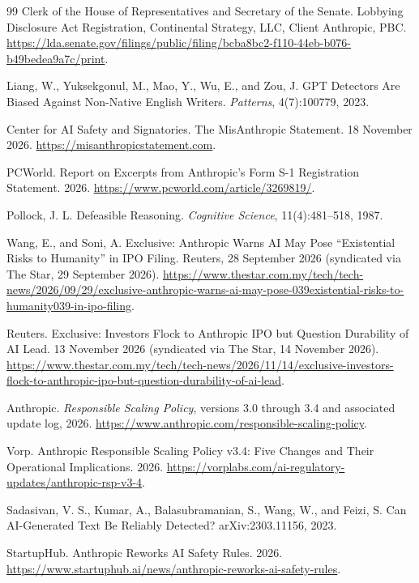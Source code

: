 \documentclass[12pt]{article}
\theoremstyle{definition}
\theoremstyle{remark}
\begin{document}
\begin{thebibliography}{99}
Clerk of the House of Representatives and Secretary of the Senate. Lobbying Disclosure Act Registration, Continental Strategy, LLC, Client Anthropic, PBC. \url{https://lda.senate.gov/filings/public/filing/bcba8bc2-f110-44eb-b076-b49bedea9a7c/print}.

Liang, W., Yuksekgonul, M., Mao, Y., Wu, E., and Zou, J. GPT Detectors Are Biased Against Non-Native English Writers. \textit{Patterns}, 4(7):100779, 2023.

Center for AI Safety and Signatories. The MisAnthropic Statement. 18 November 2026. \url{https://misanthropicstatement.com}.

PCWorld. Report on Excerpts from Anthropic's Form S-1 Registration Statement. 2026. \url{https://www.pcworld.com/article/3269819/}.

Pollock, J. L. Defeasible Reasoning. \textit{Cognitive Science}, 11(4):481--518, 1987.

Wang, E., and Soni, A. Exclusive: Anthropic Warns AI May Pose ``Existential Risks to Humanity'' in IPO Filing. Reuters, 28 September 2026 (syndicated via The Star, 29 September 2026). \url{https://www.thestar.com.my/tech/tech-news/2026/09/29/exclusive-anthropic-warns-ai-may-pose-039existential-risks-to-humanity039-in-ipo-filing}.

Reuters. Exclusive: Investors Flock to Anthropic IPO but Question Durability of AI Lead. 13 November 2026 (syndicated via The Star, 14 November 2026). \url{https://www.thestar.com.my/tech/tech-news/2026/11/14/exclusive-investors-flock-to-anthropic-ipo-but-question-durability-of-ai-lead}.

Anthropic. \textit{Responsible Scaling Policy}, versions 3.0 through 3.4 and associated update log, 2026. \url{https://www.anthropic.com/responsible-scaling-policy}.

Vorp. Anthropic Responsible Scaling Policy v3.4: Five Changes and Their Operational Implications. 2026. \url{https://vorplabs.com/ai-regulatory-updates/anthropic-rsp-v3-4}.

Sadasivan, V. S., Kumar, A., Balasubramanian, S., Wang, W., and Feizi, S. Can AI-Generated Text Be Reliably Detected? arXiv:2303.11156, 2023.

StartupHub. Anthropic Reworks AI Safety Rules. 2026. \url{https://www.startuphub.ai/news/anthropic-reworks-ai-safety-rules}.


\end{thebibliography}
\end{document}
